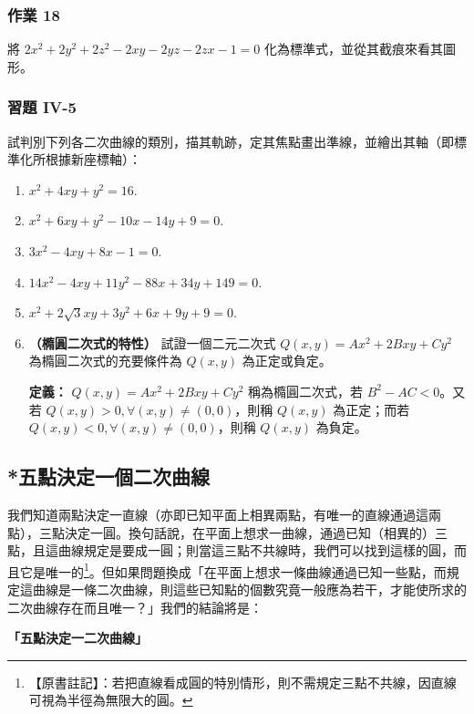 \subsubsection*{作業 18}
將 $2x^2 + 2y^2 + 2z^2 - 2xy - 2yz - 2zx - 1 = 0$ 化為標準式，並從其截痕來看其圖形。

\subsubsection*{習題 IV-5}

試判別下列各二次曲線的類別，描其軌跡，定其焦點畫出準線，並繪出其軸（即標準化所根據新座標軸）：
\begin{enumerate}
  \item $x^2 + 4xy + y^2 = 16$.
  \item $x^2 + 6xy + y^2 - 10x - 14y + 9 = 0$.
  \item $3x^2 - 4xy + 8x - 1 = 0$.
  \item $14x^2 - 4xy + 11y^2 - 88x + 34y + 149 = 0$.
  \item $x^2 + 2\sqrt{3}xy + 3y^2 + 6x + 9y + 9 = 0$.
  \item \textbf{（橢圓二次式的特性）} 試證一個二元二次式 $Q(x, y) = Ax^2 + 2Bxy + Cy^2$ 為橢圓二次式的充要條件為 $Q(x, y)$ 為正定或負定。
  
  \textbf{定義：} $Q(x, y) = Ax^2 + 2Bxy + Cy^2$ 稱為橢圓二次式，若 $B^2 - AC < 0$。又若 $Q(x, y) > 0, \forall (x, y) \ne (0, 0)$，則稱 $Q(x, y)$ 為正定；而若 $Q(x, y) < 0, \forall (x, y) \ne (0, 0)$，則稱 $Q(x, y)$ 為負定。
\end{enumerate}


\subsection{*五點決定一個二次曲線}\label{sec:b4-4-6}

我們知道兩點決定一直線（亦即已知平面上相異兩點，有唯一的直線通過這兩點），三點決定一圓。換句話說，在平面上想求一曲線，通過已知（相異的）三點，且這曲線規定是要成一圓；則當這三點不共線時，我們可以找到這樣的圓，而且它是唯一的\label{note:b4-ch4-three-points-circle}\footnote{【原書註記】：若把直線看成圓的特別情形，則不需規定三點不共線，因直線可視為半徑為無限大的圓。}。但如果問題換成「在平面上想求一條曲線通過已知一些點，而規定這曲線是一條二次曲線，則這些已知點的個數究竟一般應為若干，才能使所求的二次曲線存在而且唯一？」我們的結論將是：
\begin{center}
\textbf{「五點決定一二次曲線」}
\end{center}

